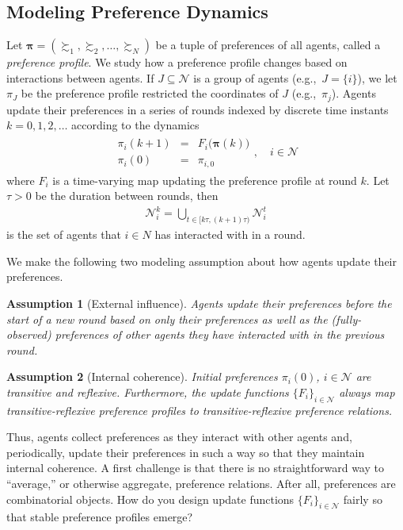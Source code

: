 \documentclass[conference]{ieeeconf}
\newcommand{\N}{\mathcal{N}}
\newcommand{\prefers}{\succsim}
\newtheorem{assumption}{Assumption}
\begin{document}
\subsection{Modeling Preference Dynamics}
Let $\boldsymbol{\pi} = \left( \prefers_1, \prefers_2, \dots, \prefers_N \right)$ be a tuple of preferences of all agents, called a \emph{preference profile}. We study how a preference profile changes based on interactions between agents. If $J \subseteq \N$ is a group of agents (e.g.,~$J = \{i\}$), we let $\pi_{J}$ be the preference profile restricted the coordinates of $J$ (e.g.,~$\pi_j$). Agents update their preferences in a series of rounds indexed by discrete time instants $k=0,1,2,\dots$ according to the dynamics
\begin{align}
    \begin{aligned}
        \pi_i(k+1) &=& F_i \bigl( \boldsymbol{\pi}(k) \bigr)  \\
        \pi_i(0) &=& \pi_{i,0}
    \end{aligned}, \quad i \in \N
    \label{eq:pi-dynamics}
\end{align}
where $F_i$ is a time-varying map updating the preference profile at round $k$. Let $\tau > 0$ be the duration between rounds, then
\begin{align*}
    \N_i^k = \bigcup_{t \in [k \tau, (k+1)\tau)} \N_i^t
\end{align*}
is the set of agents that $i \in N$ has interacted with in a round.

We make the following two modeling assumption about how agents update their preferences.
\begin{assumption}[External influence]\label{ass:external}
    Agents update their preferences before the start of a new round based on only their preferences as well as the (fully-observed) preferences of other agents they have interacted with in the previous round.
\end{assumption}
\begin{assumption}[Internal coherence] \label{ass:internal}
    Initial preferences $\pi_i(0)$, $i \in \N$ are transitive and reflexive. Furthermore, the update functions $\{ F_i \}_{i \in \N}$ always map transitive-reflexive preference profiles to transitive-reflexive preference relations.
\end{assumption}

Thus, agents collect preferences as they interact with other agents and, periodically, update their preferences in such a way so that they maintain internal coherence. A first challenge is that there is no straightforward way to ``average,'' or otherwise aggregate, preference relations. After all, preferences are combinatorial objects. How do you design update functions $\{F_i\}_{i \in \N}$ fairly so that stable preference profiles emerge?
\end{document}
